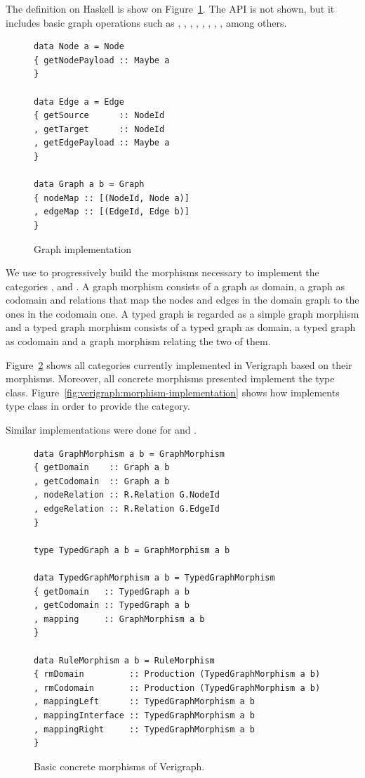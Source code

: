 The  definition on Haskell is show on Figure~\ref{fig:verigraph:graph}. The  API is not shown, but it includes basic graph operations such as , , , , , , , , among others. 

\begin{figure}[!ht]

\caption{Graph implementation}
\begin{verbatim}
data Node a = Node 
{ getNodePayload :: Maybe a
}

data Edge a = Edge 
{ getSource      :: NodeId
, getTarget      :: NodeId
, getEdgePayload :: Maybe a
}

data Graph a b = Graph 
{ nodeMap :: [(NodeId, Node a)]
, edgeMap :: [(EdgeId, Edge b)]
}
\end{verbatim}
\label{fig:verigraph:graph}
\end{figure}

We use  to progressively build the morphisms necessary to implement the categories ,  and . A graph morphism consists of a graph as domain, a graph as codomain and relations that map the nodes and edges in the domain graph to the ones in the codomain one. A typed graph is regarded as a simple graph morphism and a typed graph morphism consists of a typed graph as domain, a typed graph as codomain and a graph morphism relating the two of them.

Figure~\ref{fig:verigraph:concrete-morphisms} shows all categories currently implemented in Verigraph based on their morphisms. Moreover, all concrete morphisms presented implement the  type class. Figure~\ref{fig:verigraph:morphism-implementation} shows how  implements  type class in order to provide the  category.

Similar implementations were done for  and .

\begin{figure}[!ht]
\caption{Basic concrete morphisms of Verigraph.}
\begin{verbatim}
data GraphMorphism a b = GraphMorphism 
{ getDomain    :: Graph a b
, getCodomain  :: Graph a b
, nodeRelation :: R.Relation G.NodeId
, edgeRelation :: R.Relation G.EdgeId
}

type TypedGraph a b = GraphMorphism a b

data TypedGraphMorphism a b = TypedGraphMorphism 
{ getDomain   :: TypedGraph a b
, getCodomain :: TypedGraph a b
, mapping     :: GraphMorphism a b
}

data RuleMorphism a b = RuleMorphism 
{ rmDomain         :: Production (TypedGraphMorphism a b)
, rmCodomain       :: Production (TypedGraphMorphism a b)
, mappingLeft      :: TypedGraphMorphism a b
, mappingInterface :: TypedGraphMorphism a b
, mappingRight     :: TypedGraphMorphism a b
}
\end{verbatim}
\label{fig:verigraph:concrete-morphisms}
\end{figure}

